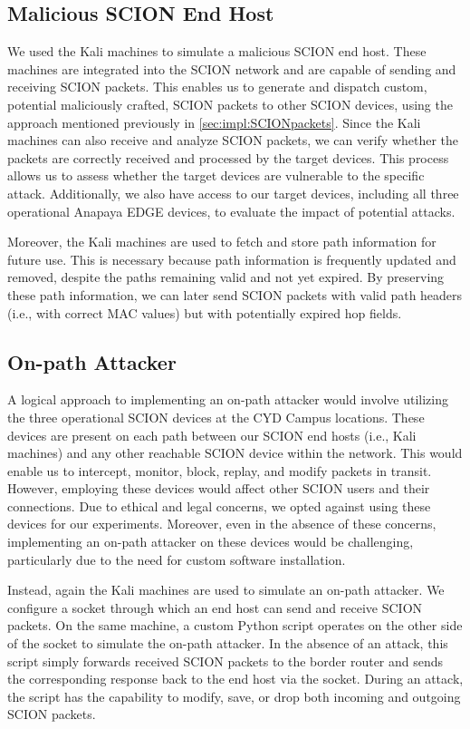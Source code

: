 \subsection{Malicious SCION End Host}
We used the Kali machines to simulate a malicious SCION end host.
These machines are integrated into the SCION network and are capable of sending and receiving SCION packets.
This enables us to generate and dispatch custom, potential maliciously crafted, SCION packets to other SCION devices, using the approach mentioned previously in \cref{sec:impl:SCIONpackets}.
Since the Kali machines can also receive and analyze SCION packets, we can verify whether the packets are correctly received and processed by the target devices.
This process allows us to assess whether the target devices are vulnerable to the specific attack.
Additionally, we also have access to our target devices, including all three operational Anapaya EDGE devices, to evaluate the impact of potential attacks.

Moreover, the Kali machines are used to fetch and store path information for future use.
This is necessary because path information is frequently updated and removed, despite the paths remaining valid and not yet expired.
By preserving these path information, we can later send SCION packets with valid path headers (i.e., with correct MAC values) but with potentially expired hop fields.

\newpage
\subsection{On-path Attacker}
A logical approach to implementing an on-path attacker would involve utilizing the three operational SCION devices at the CYD Campus locations.
These devices are present on each path between our SCION end hosts (i.e., Kali machines) and any other reachable SCION device within the network.
This would enable us to intercept, monitor, block, replay, and modify packets in transit.
However, employing these devices would affect other SCION users and their connections.
Due to ethical and legal concerns, we opted against using these devices for our experiments.
Moreover, even in the absence of these concerns, implementing an on-path attacker on these devices would be challenging, particularly due to the need for custom software installation.

Instead, again the Kali machines are used to simulate an on-path attacker.
We configure a socket through which an end host can send and receive SCION packets.
On the same machine, a custom Python script operates on the other side of the socket to simulate the on-path attacker.
In the absence of an attack, this script simply forwards received SCION packets to the border router and sends the corresponding response back to the end host via the socket.
During an attack, the script has the capability to modify, save, or drop both incoming and outgoing SCION packets.



